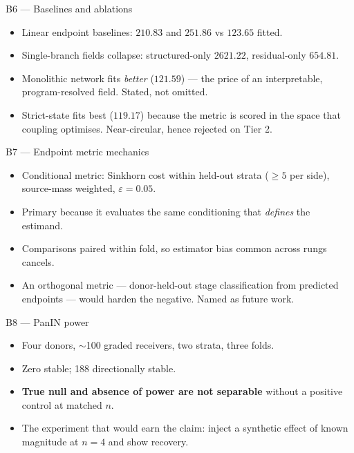\documentclass[aspectratio=169,10pt]{beamer}
\begin{document}
\begin{frame}{B6 --- Baselines and ablations}
  \begin{itemize}\small
    \item Linear endpoint baselines: $210.83$ and $251.86$ vs $123.65$ fitted.
    \item Single-branch fields collapse: structured-only $2621.22$,
          residual-only $654.81$.
    \item Monolithic network fits \emph{better} ($121.59$) --- the price of an
          interpretable, program-resolved field. Stated, not omitted.
    \item Strict-state fits best ($119.17$) because the metric is scored in the
          space that coupling optimises. Near-circular, hence rejected on Tier 2.
  \end{itemize}
\end{frame}

\begin{frame}{B7 --- Endpoint metric mechanics}
  \begin{itemize}\small
    \item Conditional metric: Sinkhorn cost within held-out strata ($\ge5$ per
          side), source-mass weighted, $\varepsilon=0.05$.
    \item Primary because it evaluates the same conditioning that \emph{defines}
          the estimand.
    \item Comparisons paired within fold, so estimator bias common across rungs
          cancels.
    \item An orthogonal metric --- donor-held-out stage classification from
          predicted endpoints --- would harden the negative. Named as future work.
  \end{itemize}
\end{frame}

\begin{frame}{B8 --- PanIN power}
  \begin{itemize}\small
    \item Four donors, $\sim$100 graded receivers, two strata, three folds.
    \item Zero stable; 188 directionally stable.
    \item \textbf{True null and absence of power are not separable} without a
          positive control at matched $n$.
    \item The experiment that would earn the claim: inject a synthetic effect of
          known magnitude at $n=4$ and show recovery.
  \end{itemize}
\end{frame}
\end{document}
